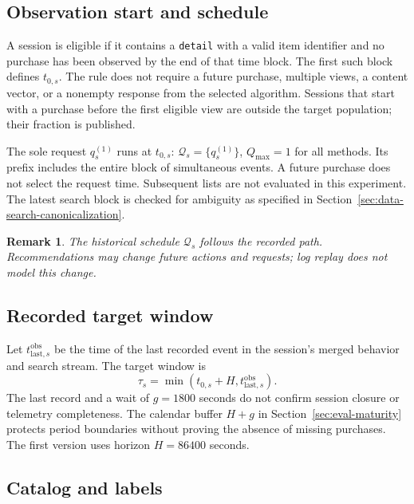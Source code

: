 \documentclass[12pt,a4paper]{article}
\newcommand{\code}[1]{{\ttfamily\small\nolinkurl{#1}}}
\theoremstyle{plainru}
\newtheorem{remark}{Remark}[section]
\begin{document}
\subsection{Observation start and schedule}

A session is eligible if it contains a \code{detail}
with a valid item identifier and no purchase has been observed by the end
of that time block. The first such block defines \(t_{0,s}\).
The rule does not require a future purchase, multiple views,
a content vector, or a nonempty response from the selected algorithm.
Sessions that start with a purchase before the first eligible view
are outside the target population; their fraction is published.

The sole request $q_s^{(1)}$ runs at \(t_{0,s}\):
$\mathcal Q_s=\{q_s^{(1)}\}$, $Q_{\max}=1$ for all methods.
Its prefix includes the entire block of simultaneous events.
A future purchase does not select the request time. Subsequent lists
are not evaluated in this experiment. The latest search block is checked
for ambiguity as specified in Section~\ref{sec:data-search-canonicalization}.

\begin{remark}
The historical schedule \(\mathcal Q_s\) follows the recorded path.
Recommendations may change future actions and requests; log replay
does not model this change.
\end{remark}

\subsection{Recorded target window}

Let $t_{\mathrm{last},s}^{\mathrm{obs}}$ be the time of the last recorded
event in the session's merged behavior and search stream. The target window is
\begin{equation}\label{eq:request-horizon}
\tau_s=\min(t_{0,s}+H,t_{\mathrm{last},s}^{\mathrm{obs}}).
\end{equation}
The last record and a wait of $g=1800$ seconds do not confirm session
closure or telemetry completeness. The calendar buffer $H+g$ in
Section~\ref{sec:eval-maturity} protects period boundaries without proving
the absence of missing purchases. The first version uses horizon $H=86400$ seconds.

\subsection{Catalog and labels}
\end{document}
